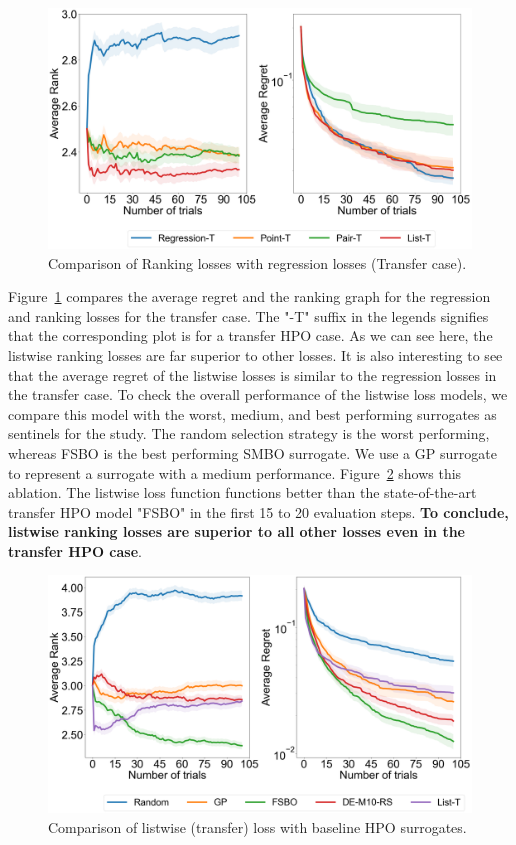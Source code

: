 \documentclass[12pt, twoside, ngerman]{report}
\begin{document}
\begin{figure}[h]
  \centering
    \includegraphics[scale=0.25]{images/Q1AblationTransfer}
    \caption{Comparison of Ranking losses with regression losses (Transfer case).}
    \label{fig:Q1AblationTransfer}
\end{figure}

Figure~\ref{fig:Q1AblationTransfer} compares the average regret and the ranking graph for the regression and ranking losses for the transfer case.
The "-T" suffix in the legends signifies that the corresponding plot is for a transfer HPO case.
As we can see here,  the listwise ranking losses are far superior to other losses.
It is also interesting to see that the average regret of the listwise losses is similar to the regression losses in the transfer case.
To check the overall performance of the listwise loss models, we compare this model with the worst,  medium, and best performing surrogates as sentinels for the study.
The random selection strategy is the worst performing,  whereas FSBO is the best performing SMBO surrogate. We use a GP surrogate to represent a surrogate with a medium performance.
Figure~\ref{fig:Q1FinalAblation} shows this ablation.
The listwise loss function functions better than the state-of-the-art transfer HPO model "FSBO" in the first 15 to 20 evaluation steps.
\textbf{To conclude,  listwise ranking losses are superior to all other losses even in the transfer HPO case}.

\begin{figure}[h]
  \centering
    \includegraphics[scale=0.25]{images/Q1FinalAblation}
    \caption{Comparison of listwise (transfer) loss with baseline HPO surrogates.}
    \label{fig:Q1FinalAblation}
\end{figure}
\end{document}
